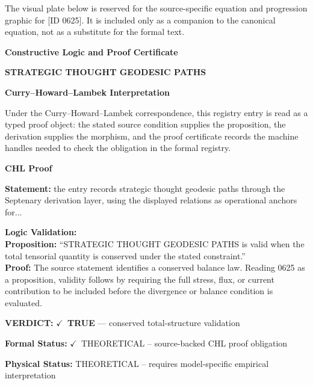 \begingroup\footnotesize\sloppy
The visual plate below is reserved for the source-specific equation and progression graphic for [ID 0625]. It is included only as a companion to the canonical equation, not as a substitute for the formal text.
\par\endgroup
\ifTZPDarkEdition
{}
\fi

\clearpage
\begingroup\tzpsupportsetup
\noindent\textbf{\fontsize{10.8pt}{12.8pt}\selectfont [ID 0625] Constructive Logic and Proof Certificate}\par
\noindent\textbf{\fontsize{10pt}{12pt}\selectfont STRATEGIC THOUGHT GEODESIC PATHS}\par
\vspace{0.45em}
\begingroup
\footnotesize
\setlength{\parskip}{0.22em}
\setlength{\parindent}{0pt}
\noindent\textbf{Curry--Howard--Lambek Interpretation}\par
Under the Curry--Howard--Lambek correspondence, this registry entry is read as a typed proof
object: the stated source condition supplies the proposition, the derivation supplies the
morphism, and the proof certificate records the machine handles needed to check the obligation
in the formal registry.

\vspace{0.45em}
\noindent\textbf{CHL Proof}\par
\textbf{Statement:} the entry records strategic thought geodesic paths through the Septenary derivation
layer, using the displayed relations as operational anchors for...

\textbf{Logic Validation:}\\
\textbf{Proposition:} ``STRATEGIC THOUGHT GEODESIC PATHS is valid when the total tensorial quantity is conserved
under the stated constraint.''\\
\textbf{Proof:} The source statement identifies a conserved balance law. Reading 0625 as a proposition,
validity follows by requiring the full stress, flux, or current contribution to be
included before the divergence or balance condition is evaluated.

\textbf{VERDICT:} \ensuremath{\checkmark}\ \textbf{TRUE} --- conserved total-structure validation

\textbf{Formal Status:} \ensuremath{\checkmark}\ THEORETICAL -- source-backed CHL proof obligation

\textbf{Physical Status:} THEORETICAL -- requires model-specific empirical interpretation
\par\vspace{0.45em}
\par
\ifTZPDarkEdition
{}
\fi
\endgroup
\endgroup
